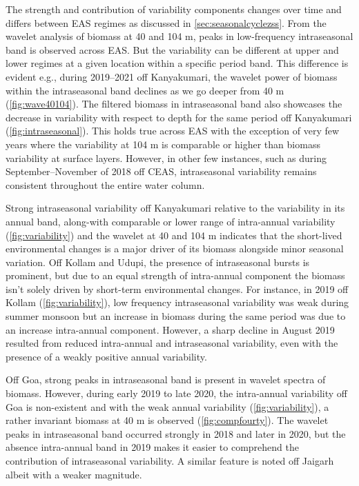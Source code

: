 \documentclass{article}
\begin{document}
	The strength and contribution of variability components changes over time  and differs between EAS regimes as discussed in \autoref{sec:seasonalcyclezss}. From the wavelet analysis of biomass at 40 and 104 m, peaks in low-frequency intraseasonal band is observed across EAS. But the variability can be different at upper and lower regimes at a given location within a specific period band. This difference is evident e.g., during 2019--2021 off Kanyakumari, the wavelet power of biomass within the intraseasonal band declines as we go deeper from 40 m (\cref{fig:wave40104}). The filtered biomass in intraseasonal band also showcases the decrease in variability with respect to depth for the same period off Kanyakumari (\cref{fig:intraseasonal}). This holds true across EAS with the exception of very few years where the variability at 104 m is comparable or higher than biomass variability at surface layers. However, in other few instances, such as during September--November of 2018 off CEAS, intraseasonal variability remains consistent throughout the entire water column. 
	
	Strong intraseasonal variability off Kanyakumari relative to the variability in its annual band, along-with comparable or lower range of intra-annual variability (\cref{fig:variability}) and the wavelet at 40 and 104 m indicates that the short-lived environmental changes is a major driver of its biomass alongside minor seasonal variation. Off Kollam and Udupi, the presence of intraseasonal bursts is prominent, but due to an equal strength of intra-annual component the biomass isn't solely driven by short-term environmental changes. For instance, in 2019 off Kollam (\cref{fig:variability}), low frequency intraseasonal variability was weak during summer monsoon but an increase in biomass during the same period was due to an increase intra-annual component. However, a sharp decline in August 2019 resulted from reduced intra-annual and intraseasonal variability, even with the presence of a weakly positive annual variability. 
	
	Off Goa, strong peaks in intraseasonal band is present in wavelet spectra of biomass. However, during early 2019 to late 2020, the intra-annual variability off Goa is non-existent and with the weak annual variability (\cref{fig:variability}), a rather invariant biomass at 40 m is observed (\cref{fig:compfourty}). The wavelet peaks in intraseasonal band occurred strongly in 2018 and later in 2020, but the absence intra-annual band in 2019 makes it easier to comprehend the contribution of intraseasonal variability. A similar feature is noted off Jaigarh albeit with a weaker magnitude. 
	
\end{document}
